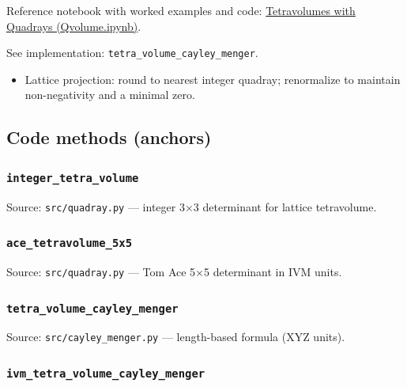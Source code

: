 \documentclass[
]{article}
\providecommand{\tightlist}{%
  \setlength{\itemsep}{0pt}\setlength{\parskip}{0pt}}
\begin{document}
Reference notebook with worked examples and code:
\href{https://github.com/4dsolutions/School_of_Tomorrow/blob/master/Qvolume.ipynb}{Tetravolumes
with Quadrays (Qvolume.ipynb)}.

See implementation: \texttt{tetra\_volume\_cayley\_menger}.

\begin{itemize}
\tightlist
\item
  Lattice projection: round to nearest integer quadray; renormalize to
  maintain non-negativity and a minimal zero.
\end{itemize}

\hypertarget{code-methods-anchors}{%
\subsection{Code methods (anchors)}\label{code-methods-anchors}}

\hypertarget{code:integer_tetra_volume}{%
\subsubsection{\texorpdfstring{\texttt{integer\_tetra\_volume}}{integer\_tetra\_volume}}\label{code:integer_tetra_volume}}

Source: \texttt{src/quadray.py} --- integer 3×3 determinant for lattice
tetravolume.

\hypertarget{code:ace_tetravolume_5x5}{%
\subsubsection{\texorpdfstring{\texttt{ace\_tetravolume\_5x5}}{ace\_tetravolume\_5x5}}\label{code:ace_tetravolume_5x5}}

Source: \texttt{src/quadray.py} --- Tom Ace 5×5 determinant in IVM
units.

\hypertarget{code:tetra_volume_cayley_menger}{%
\subsubsection{\texorpdfstring{\texttt{tetra\_volume\_cayley\_menger}}{tetra\_volume\_cayley\_menger}}\label{code:tetra_volume_cayley_menger}}

Source: \texttt{src/cayley\_menger.py} --- length-based formula (XYZ
units).

\hypertarget{code:ivm_tetra_volume_cayley_menger}{%
\subsubsection{\texorpdfstring{\texttt{ivm\_tetra\_volume\_cayley\_menger}}{ivm\_tetra\_volume\_cayley\_menger}}\label{code:ivm_tetra_volume_cayley_menger}}
\end{document}
